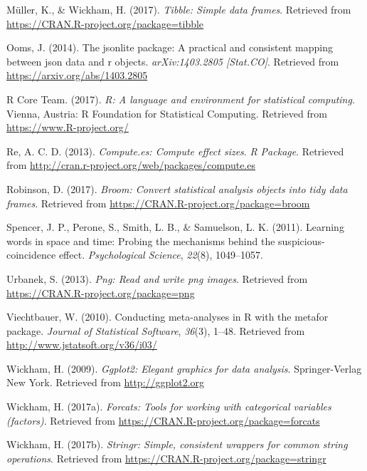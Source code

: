 \documentclass[english,floatsintext,man]{apa6}
\theoremstyle{definition}
\theoremstyle{definition}
\theoremstyle{remark}
\begin{document}
\hypertarget{ref-R-tibble}{}
Müller, K., \& Wickham, H. (2017). \emph{Tibble: Simple data frames}.
Retrieved from \url{https://CRAN.R-project.org/package=tibble}

\hypertarget{ref-R-jsonlite}{}
Ooms, J. (2014). The jsonlite package: A practical and consistent
mapping between json data and r objects. \emph{arXiv:1403.2805
{[}Stat.CO{]}}. Retrieved from \url{https://arxiv.org/abs/1403.2805}

\hypertarget{ref-R-base}{}
R Core Team. (2017). \emph{R: A language and environment for statistical
computing}. Vienna, Austria: R Foundation for Statistical Computing.
Retrieved from \url{https://www.R-project.org/}

\hypertarget{ref-R-compute.es}{}
Re, A. C. D. (2013). \emph{Compute.es: Compute effect sizes}. \emph{R
Package}. Retrieved from
\url{http://cran.r-project.org/web/packages/compute.es}

\hypertarget{ref-R-broom}{}
Robinson, D. (2017). \emph{Broom: Convert statistical analysis objects
into tidy data frames}. Retrieved from
\url{https://CRAN.R-project.org/package=broom}

\hypertarget{ref-spencer2011learning}{}
Spencer, J. P., Perone, S., Smith, L. B., \& Samuelson, L. K. (2011).
Learning words in space and time: Probing the mechanisms behind the
suspicious-coincidence effect. \emph{Psychological Science},
\emph{22}(8), 1049--1057.

\hypertarget{ref-R-png}{}
Urbanek, S. (2013). \emph{Png: Read and write png images}. Retrieved
from \url{https://CRAN.R-project.org/package=png}

\hypertarget{ref-R-metafor}{}
Viechtbauer, W. (2010). Conducting meta-analyses in R with the metafor
package. \emph{Journal of Statistical Software}, \emph{36}(3), 1--48.
Retrieved from \url{http://www.jstatsoft.org/v36/i03/}

\hypertarget{ref-R-ggplot2}{}
Wickham, H. (2009). \emph{Ggplot2: Elegant graphics for data analysis}.
Springer-Verlag New York. Retrieved from \url{http://ggplot2.org}

\hypertarget{ref-R-forcats}{}
Wickham, H. (2017a). \emph{Forcats: Tools for working with categorical
variables (factors)}. Retrieved from
\url{https://CRAN.R-project.org/package=forcats}

\hypertarget{ref-R-stringr}{}
Wickham, H. (2017b). \emph{Stringr: Simple, consistent wrappers for
common string operations}. Retrieved from
\url{https://CRAN.R-project.org/package=stringr}
\end{document}
